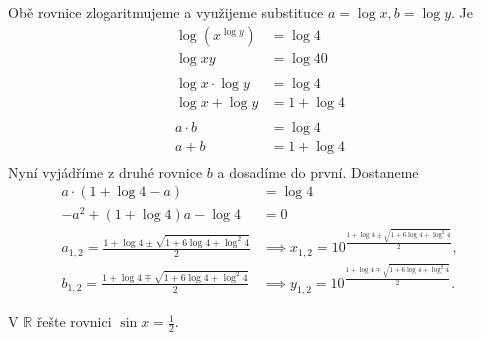 \begin{reseni}
Obě rovnice zlogaritmujeme a využijeme substituce $a=\log x, b=\log y.$ Je
\begin{align*}
	\log(x^{\log y})&=\log 4\\
	\log xy&=\log 40\\
	&\\
	\log x \cdot \log y &= \log 4\\
	\log x + \log y &= 1 + \log 4\\
	&\\
	a \cdot b &= \log 4\\
	a + b &= 1 + \log 4\\
\end{align*}
Nyní vyjádříme z druhé rovnice $b$ a dosadíme do první. Dostaneme
\begin{align*}
	a \cdot (1+ \log 4 -a) &= \log 4\\
	-a^2 +(1+ \log 4)a - \log 4 &= 0\\
	a_{1,2} = \frac{1+\log 4 \pm \sqrt{1+6\log 4 + \log^2 4}}{2} &\implies x_{1,2} = 10^{\frac{1+\log 4 \pm \sqrt{1+6\log 4 + \log^2 4}}{2}},\\
	b_{1,2} = \frac{1+\log 4 \mp \sqrt{1+6\log 4 + \log^2 4}}{2} &\implies y_{1,2} = 10^{\frac{1+\log 4 \mp \sqrt{1+6\log 4 + \log^2 4}}{2}}.
\end{align*}
\end{reseni}

\begin{priklad}\label{gonrce1}
V $\mathbb R$ řešte rovnici $\sin x = \frac{1}{2}.$
\end{priklad}


